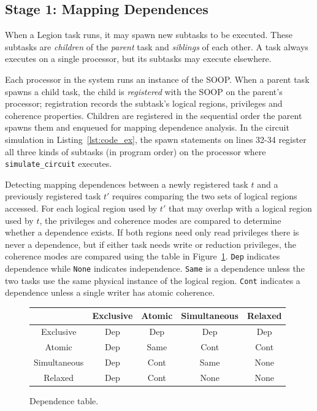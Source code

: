 \subsection{Stage 1: Mapping Dependences}
\label{sec:dep}


When a Legion task runs, it may spawn new subtasks to be executed.  
These subtasks are {\em children} of the {\em parent} task and {\em siblings} of each other.  
A task always executes on a single processor, but
its subtasks may execute elsewhere.

Each processor in the system runs an instance of the SOOP.
When a parent task spawns a child task, the child is {\em registered}
with the SOOP on the parent's processor;
registration records the subtask's logical regions,
privileges and coherence properties.  Children are
registered in the sequential order the parent
spawns them and enqueued for mapping dependence analysis.  In the
circuit simulation in Listing~\ref{lst:code_ex}, the spawn
statements on lines 32-34 register all three
kinds of subtasks (in program order) on the processor where {\tt
simulate\_circuit} executes.

Detecting mapping dependences between a newly registered task $t$ and
a previously registered task $t'$ requires comparing the two sets of
logical regions accessed.  For each logical region used by $t'$ that
may overlap with a logical region used by $t$, the privileges and
coherence modes are compared to determine whether a dependence exists.
If both regions need only read privileges there is never a dependence,
but if either task needs write or reduction privileges, the coherence
modes are compared using the table in Figure~\ref{fig:dependence}.
{\tt Dep} indicates dependence while {\tt None}
indicates independence.  {\tt Same} is a dependence unless the two tasks
use the same physical instance of the logical region.
{\tt Cont} 
indicates a dependence unless a single writer has
atomic coherence.  


\begin{figure}
{\small
\begin{tabular}{c|cccc}
             & Exclusive & Atomic   & Simultaneous & Relaxed \\
\midrule
Exclusive    & Dep & Dep & Dep & Dep \\ 
Atomic       & Dep & Same & Cont & Cont \\
Simultaneous & Dep & Cont & Same & None \\
Relaxed      & Dep & Cont & None & None \\
\end{tabular}
}
\caption{Dependence table.}
\label{fig:dependence}
\end{figure}

